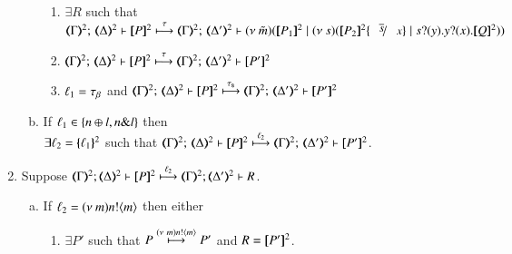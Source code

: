 \begin{proposition}
\begin{enumerate}[1.]
\begin{enumerate}[a)]
\begin{enumerate}[-]
					\item	$\exists R$ such that
						$\tmap{\Gamma}{2};\, \tmap{\Delta}{2} \proves \pmap{P}{2}
						\hby{\tau}
						\tmap{\Gamma}{2};\, \tmap{\Delta'}{2} \proves \newsp{\tilde{m}}{\pmap{P_1}{2} \Par \newsp{s}
						{\pmap{P_2}{2}\subst{\dual{s}}{x} \Par \binp{s}{y} \binp{y}{x} \pmap{Q}{2}}}$

					\item	%
						$\tmap{\Gamma}{2};\, \tmap{\Delta}{2} \proves \pmap{P}{2}
						\hby{\tau}
						\tmap{\Gamma}{2};\, \tmap{\Delta'}{2} \proves \pmap{P'}{2}$

					\item	$\ell_1 = \tau_{\beta}$ and
						$\tmap{\Gamma}{2};\, \tmap{\Delta}{2} \proves \pmap{P}{2}
						\hby{\stau}
						\tmap{\Gamma}{2};\, \tmap{\Delta'}{2} \proves \pmap{P'}{2}$
				\end{enumerate}

				   			   

			\item	 
				If  
				$\ell_1 \in \{n \oplus l, n \& l\}$
				 then \\
				$\exists \ell_2 = \{\!\!\{\ell_1\}\!\!\}^{2}$ such that 
				$\mapt{\Gamma}^{2};\, \mapt{\Delta}^{2} \proves  \map{P}^{2}
				\hby{\ell_2}
				\mapt{\Gamma}^{2};\, \mapt{\Delta'}^{2} \proves  \map{P'}^{2}$.			
		\end{enumerate}
		
		\item Suppose 
		$\stytra{\mapt{\Gamma}^{2}}{\ell_2}{\mapt{\Delta}^{2}}{\map{P}^{2}}{\mapt{\Delta'}^{2}}{R}$.
			\begin{enumerate}[a)]
				\item %
					If  
					$\ell_2 = (\nu\ m)n ! \langle m \rangle$
					then 
					either 
					\begin{enumerate}[-]
					\item	$\exists P'$ such that $P \stackrel{(\nu\ m) n ! \langle m \rangle}{\longmapsto} P'$
						and $R = [\!\![P']\!\!]^{2}$.


\end{enumerate}
\end{enumerate}
\end{enumerate}
\end{proposition}

